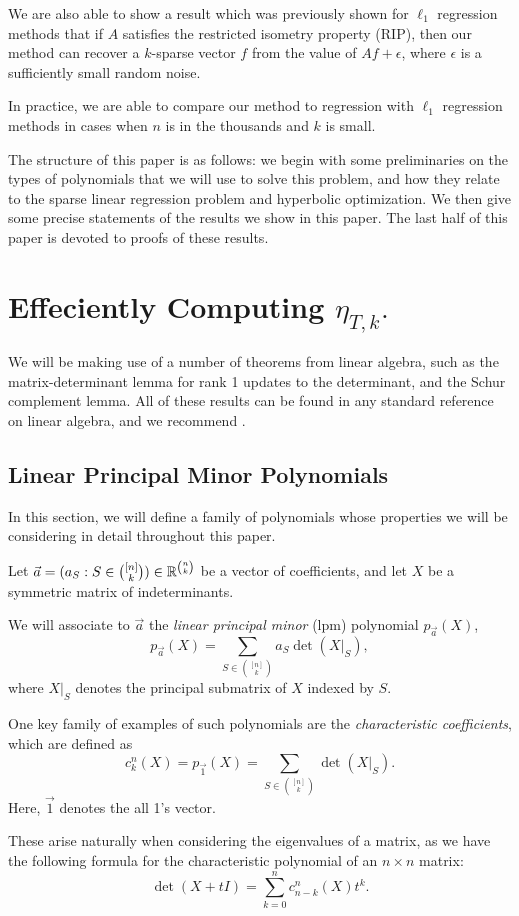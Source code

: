 \documentclass{amsart}
\theoremstyle{definition}
\numberwithin{equation}{section}
\begin{document}
We are also able to show a result which was previously shown for $\ell_1$ regression methods that if $A$ satisfies the restricted isometry property (RIP), then our method can recover a $k$-sparse vector $f$ from the value of $Af+\epsilon$, where $\epsilon$ is a sufficiently small random noise.

In practice, we are able to compare our method to regression with $\ell_1$ regression methods in cases when $n$ is in the thousands and $k$ is small. %

The structure of this paper is as follows: we begin with some preliminaries on the types of polynomials that we will use to solve this problem, and how they relate to the sparse linear regression problem and hyperbolic optimization.
We then give some precise statements of the results we show in this paper.
The last half of this paper is devoted to proofs of these results.
\section{Effeciently Computing $\eta_{T, k}.$}
We will be making use of a number of theorems from linear algebra, such as the matrix-determinant lemma for rank 1 updates to the determinant, and the Schur complement lemma.
All of these results can be found in any standard reference on linear algebra, and we recommend \cite{horn2012matrix}.
\subsection{Linear Principal Minor Polynomials}
In this section, we will define a family of polynomials whose properties we will be considering in detail throughout this paper.

Let $\vec{a} = (a_S : S \in \binom{[n]}{k}) \in \mathbb{R}^{\binom{n}{k}}$ be a vector of coefficients, and let $X$ be a symmetric matrix of indeterminants.

We will associate to $\vec{a}$ the \emph{linear principal minor} (lpm) polynomial $p_{\vec{a}}(X)$,
\[
    p_{\vec{a}}(X) = \sum_{S \in \binom{[n]}{k}} a_S\det(X|_S),
\]
where $X|_S$ denotes the principal submatrix of $X$ indexed by $S$.

One key family of examples of such polynomials are the \emph{characteristic coefficients}, which are defined as
\[
    c_k^n(X) = p_{\vec{1}}(X) = \sum_{S \in \binom{[n]}{k}} \det(X|_S).
\]
Here, $\vec{1}$ denotes the all 1's vector.

These arise naturally when considering the eigenvalues of a matrix, as we have the following formula for the characteristic polynomial of an $n\times n$ matrix:
\[
    \det(X + tI) = \sum_{k=0}^n c_{n-k}^n(X) t^k.
\]
\end{document}
